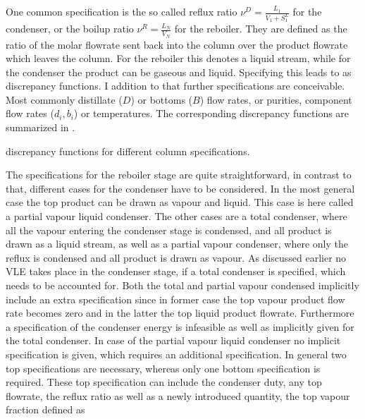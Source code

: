         One common specification is the so called reflux ratio $\nu^D = \frac{L_1}{V_1 + S_1^L}$ for
        the condenser, or the boilup ratio $\nu^R = \frac{L_N}{V_N}$ for the reboiler.
        They are defined as the ratio of the molar flowrate sent back into the column over the
        product flowrate which leaves the column. For the reboiler this denotes a liquid stream,
        while for the condenser the product can be gaseous and liquid. Specifying this leads to
        as discrepancy functions. I addition to that further specifications are conceivable. Most
        commonly distillate ($D$) or bottoms ($B$) flow rates, or purities, component flow rates ($d_i, b_i$)
        or temperatures. The corresponding discrepancy functions are summarized in .

        \begin{table}
            \centering
            \footnotesize
            
            \caption{discrepancy functions for different column specifications.}
            \label{tab:discrepancy}
        \end{table}

        The specifications for the reboiler stage are quite straightforward, in contrast to that,
        different cases for the condenser have to be considered. In the most general case the
        top product can be drawn as vapour and liquid. This case is here called a partial vapour
        liquid condenser. The other cases are a total condenser, where all the vapour entering the
        condenser stage is condensed, and all product is drawn as a liquid stream, as well as
        a partial vapour condenser, where only the reflux is condensed and all product is drawn
        as vapour. As discussed earlier no VLE takes place in the condenser stage, if a total
        condenser is specified, which needs to be accounted for. Both the total and partial
        vapour condensed implicitly include an extra specification since in former case
        the top vapour product flow rate becomes zero and in the latter the top liquid product
        flowrate. Furthermore a specification of the condenser energy is infeasible as well as implicitly
        given for the total condenser. In case of the partial vapour liquid condenser no implicit
        specification is given, which requires an additional specification. In general two
        top specifications are necessary, whereas only one bottom specification is required.
        These top specification can include the condenser duty, any top flowrate, the reflux ratio
        as well as a newly introduced quantity, the top vapour fraction defined as

